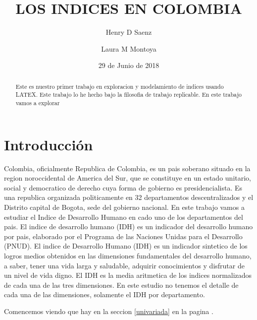 \documentclass{article}
\title{LOS INDICES EN COLOMBIA}
\author[1]{\normalsize Henry D Saenz}
\author[2]{\normalsize Laura M Montoya}
\affil[1,2]{\small  Universidad de los Andes\\
\texttt{{hd.saenz10,lm.montoya10}@uniandes.edu.col}}
\affil[1,2]{\small Ecole des Mines de Nantes\\
\texttt{{hsaenz16,lmontoya16}@imt-atlantique.fr}}
\date{29 de Junio de 2018}
\begin{document}


\maketitle


\begin{abstract}
Este es nuestro primer trabajo en exploracion y modelamiento de indices usando LATEX. Este trabajo lo he hecho bajo la filosofia de trabajo replicable. En este trabajo vamos a explorar
\end{abstract}

\section*{Introducci\'on}

Colombia, oficialmente Republica de Colombia, es un pais soberano situado en la region noroccidental de America del Sur, que se constituye en un estado unitario, social y democratico de derecho cuya forma de gobierno es presidencialista. Es una republica organizada politicamente en 32 departamentos descentralizados y el Distrito capital de Bogota, sede del gobierno nacional.  En este trabajo vamos a estudiar el Indice de Desarrollo Humano en cado uno de los departamentos del pais. 
El indice de desarrollo humano (IDH) es un indicador del desarrollo humano por pais, elaborado por el Programa de las Naciones Unidas para el Desarrollo (PNUD). El indice de Desarrollo Humano (IDH) es un indicador sintetico de los logros medios obtenidos en las dimensiones fundamentales del desarrollo humano, a saber, tener una vida larga y saludable, adquirir conocimientos y disfrutar de un nivel de vida digno. El IDH es la media aritmetica de los indices normalizados de cada una de las tres dimensiones. En este estudio no tenemos el detalle de cada una de las dimensiones, solamente el IDH por departamento.

Comencemos viendo que hay en la seccion \ref{univariada} en la pagina \pageref{univariada}.

\clearpage








\renewcommand{\refname}{Bibliografia}

\end{document}
